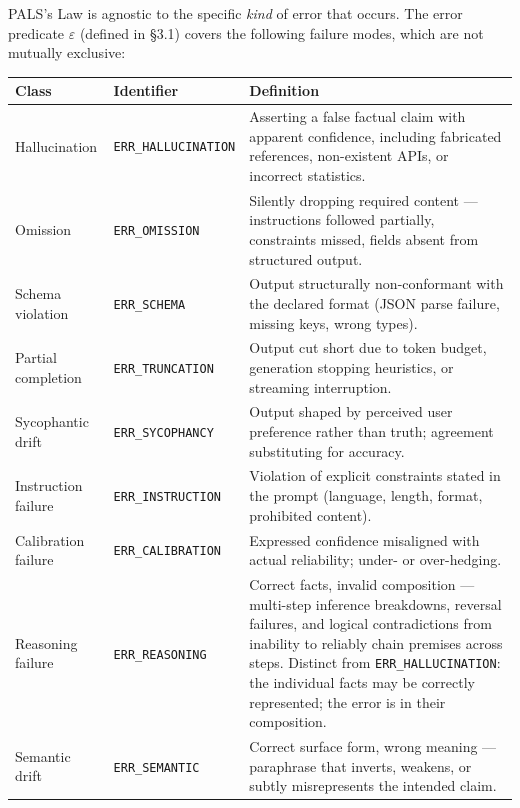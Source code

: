 \documentclass[11pt,a4paper]{article}
\begin{document}
PALS's Law is agnostic to the specific \emph{kind} of error that occurs. The error predicate $\varepsilon$ (defined in \S3.1) covers the following failure modes, which are not mutually exclusive:

\begin{longtable}{p{} p{} p{}}
\toprule
\textbf{Class} & \textbf{Identifier} & \textbf{Definition} \\
\midrule
\endhead
Hallucination & \texttt{ERR\_HALLUCINATION} & Asserting a false factual claim with apparent confidence, including fabricated references, non-existent APIs, or incorrect statistics. \\
\midrule
Omission & \texttt{ERR\_OMISSION} & Silently dropping required content --- instructions followed partially, constraints missed, fields absent from structured output. \\
\midrule
Schema violation & \texttt{ERR\_SCHEMA} & Output structurally non-conformant with the declared format (JSON parse failure, missing keys, wrong types). \\
\midrule
Partial completion & \texttt{ERR\_TRUNCATION} & Output cut short due to token budget, generation stopping heuristics, or streaming interruption. \\
\midrule
Sycophantic drift & \texttt{ERR\_SYCOPHANCY} & Output shaped by perceived user preference rather than truth; agreement substituting for accuracy. \\
\midrule
Instruction failure & \texttt{ERR\_INSTRUCTION} & Violation of explicit constraints stated in the prompt (language, length, format, prohibited content). \\
\midrule
Calibration failure & \texttt{ERR\_CALIBRATION} & Expressed confidence misaligned with actual reliability; under- or over-hedging. \\
\midrule
Reasoning failure & \texttt{ERR\_REASONING} & Correct facts, invalid composition --- multi-step inference breakdowns, reversal failures, and logical contradictions from inability to reliably chain premises across steps. Distinct from \texttt{ERR\_HALLUCINATION}: the individual facts may be correctly represented; the error is in their composition. \\
\midrule
Semantic drift & \texttt{ERR\_SEMANTIC} & Correct surface form, wrong meaning --- paraphrase that inverts, weakens, or subtly misrepresents the intended claim. \\
\bottomrule
\end{longtable}
\end{document}
